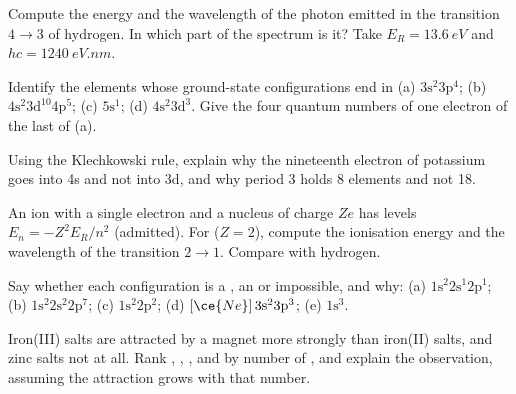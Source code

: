 \begin{exercise}[$\star\star$]\label{exo:b1:quantum-numbers:7}
Compute the energy and the wavelength of the photon emitted in the
transition $4 \to 3$ of hydrogen. In which part of the spectrum is it?
Take $E_R = \qty{13.6}{eV}$ and $hc = \qty{1240}{eV.nm}$.
\end{exercise}

\begin{exercise}[$\star\star$]\label{exo:b1:quantum-numbers:8}
Identify the elements whose ground-state configurations end in
(a) $3\text{s}^2 3\text{p}^4$; (b) $4\text{s}^2 3\text{d}^{10} 4\text{p}^5$;
(c) $5\text{s}^1$; (d) $4\text{s}^2 3\text{d}^3$. Give the four quantum
numbers of one electron of the last  of (a).
\end{exercise}

\begin{exercise}[$\star\star$]\label{exo:b1:quantum-numbers:9}
Using the Klechkowski rule, explain why the nineteenth electron of
potassium goes into 4s and not into 3d, and why period 3 holds 8
elements and not 18.
\end{exercise}

\begin{exercise}[$\star\star\star$]\label{exo:b1:quantum-numbers:10}
An ion with a single electron and a nucleus of charge $Ze$ has levels
$E_n = -Z^2 E_R/n^2$ (admitted). For  ($Z = 2$), compute the
ionisation energy and the wavelength of the transition $2 \to 1$.
Compare with hydrogen.
\end{exercise}

\begin{exercise}[$\star\star\star$]\label{exo:b1:quantum-numbers:11}
Say whether each configuration is a , an  or
impossible, and why: (a) $1\text{s}^2 2\text{s}^1 2\text{p}^1$;
(b) $1\text{s}^2 2\text{s}^2 2\text{p}^7$; (c) $1\text{s}^2 2\text{p}^2$;
(d) $[\ce{Ne}]\,3\text{s}^2 3\text{p}^3$; (e) $1\text{s}^3$.
\end{exercise}

\begin{exercise}[$\star\star\star$]\label{exo:b1:quantum-numbers:12}
Iron(III) salts are attracted by a magnet more strongly than iron(II)
salts, and zinc salts not at all. Rank , ,
,  and  by number of , and explain the observation, assuming the attraction grows
with that number.
\end{exercise}

